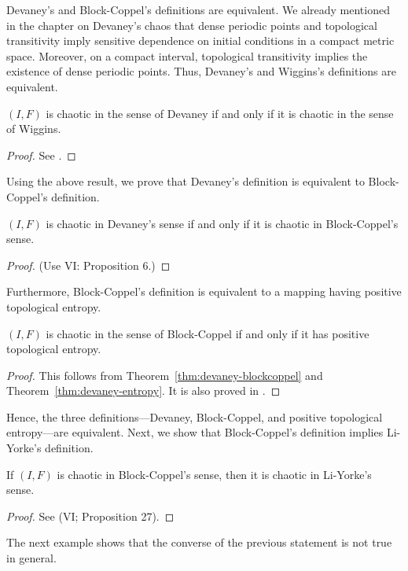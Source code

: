 \documentclass[12pt,twoside,draft]{book}
\begin{document}
Devaney's and Block-Coppel's definitions are equivalent.
We already mentioned in the chapter on Devaney's chaos that dense periodic points and topological transitivity imply sensitive dependence on initial conditions in a compact metric space.
Moreover, on a compact interval, topological transitivity implies the existence of dense periodic points.
Thus, Devaney's and Wiggins's definitions are equivalent.
\begin{theorem}
  $(I,F)$ is chaotic in the sense of Devaney if and only if it is chaotic in the sense of Wiggins.
  \label{thm:devaney-wiggins}
  \begin{proof}
    See \citet{silverman}.
  \end{proof}
\end{theorem}
Using the above result, we prove that Devaney's definition is equivalent to Block-Coppel's definition. 
\begin{theorem}
  \citep{aulbach}
  $(I,F)$ is chaotic in Devaney's sense if and only if it is chaotic in Block-Coppel's sense.
  \begin{proof}
    \citep{aulbach}
    (Use \citep{blockcoppel} VI: Proposition 6.)
  \end{proof}
  \label{thm:devaney-blockcoppel}
\end{theorem}

Furthermore, Block-Coppel's definition is equivalent to a mapping having positive topological entropy.
\begin{theorem}
  $(I,F)$ is chaotic in the sense of Block-Coppel if and only if it has positive topological entropy.
  \label{thm:entropy-blockcoppel}
  \begin{proof}
    This follows from Theorem~\ref{thm:devaney-blockcoppel} and Theorem~\ref{thm:devaney-entropy}.
    It is also proved in \citet[VII, Theorem 24]{blockcoppel}.
  \end{proof}
\end{theorem}
Hence, the three definitions---Devaney, Block-Coppel, and positive topological entropy---are equivalent.
Next, we show that Block-Coppel's definition implies Li-Yorke's definition.
\begin{theorem}
  \citep{blockcoppel}
  If $(I,F)$ is chaotic in Block-Coppel's sense, then it is chaotic in Li-Yorke's sense.
  \label{thm:devaney-liyorke}
  \begin{proof}
    See \citet{blockcoppel} (VI; Proposition 27).
  \end{proof}
\end{theorem}
The next example shows that the converse of the previous statement is not true in general.
\begin{example}
  \citep{blockcoppel}
  \label{eg:counterexample}
\end{example}
\end{document}
